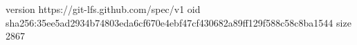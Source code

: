 version https://git-lfs.github.com/spec/v1
oid sha256:35ee5ad2934b74803eda6cf670e4ebf47cf430682a89ff129f588c58c8ba1544
size 2867
